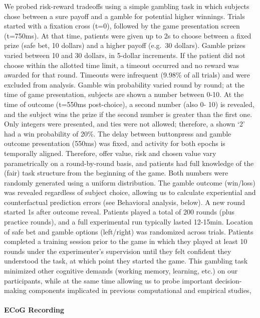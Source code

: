 \documentclass[11pt]{article}
\begin{document}
We probed risk-reward tradeoffs using a simple gambling task in which
subjects chose between a sure payoff and a gamble for potential higher
winnings. Trials started with a fixation cross (t=0), followed by the
game presentation screen (t=750ms). At that time, patients were given up
to 2s to choose between a fixed prize (safe bet, 10 dollars) and a
higher payoff (e.g.~30 dollars). Gamble prizes varied between 10 and 30
dollars, in 5-dollar increments. If the patient did not choose within
the allotted time limit, a timeout occurred and no reward was awarded
for that round. Timeouts were infrequent (9.98\% of all trials) and were
excluded from analysis. Gamble win probability varied round by round; at
the time of game presentation, subjects are shown a number between 0-10.
At the time of outcome (t=550ms post-choice), a second number (also 0-
10) is revealed, and the subject wins the prize if the second number is
greater than the first one. Only integers were presented, and ties were
not allowed; therefore, a shown `2' had a win probability of 20\%. The
delay between buttonpress and gamble outcome presentation (550ms) was
fixed, and activity for both epochs is temporally aligned. Therefore,
offer value, risk and chosen value vary parametrically on a
round-by-round basis, and patients had full knowledge of the (fair) task
structure from the beginning of the game. Both numbers were randomly
generated using a uniform distribution. The gamble outcome (win/loss)
was revealed regardless of subject choice, allowing us to calculate
experiential and counterfactual prediction errors (see Behavioral
analysis, below). A new round started 1s after outcome reveal. Patients
played a total of 200 rounds (plus practice rounds), and a full
experimental run typically lasted 12-15min. Location of safe bet and
gamble options (left/right) was randomized across trials. Patients
completed a training session prior to the game in which they played at
least 10 rounds under the experimenter's supervision until they felt
confident they understood the task, at which point they started the
game. This gambling task minimized other cognitive demands (working
memory, learning, etc.) on our participants, while at the same time
allowing us to probe important decision-making components implicated in
previous computational and empirical studies,

\hypertarget{ecog-recording}{%
\paragraph{ECoG Recording}\label{ecog-recording}}
\end{document}
